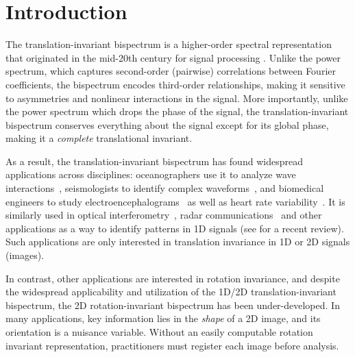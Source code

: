 \section{Introduction}
The translation-invariant bispectrum is a higher-order spectral representation that originated in the mid-20th century for signal processing \citep{tukey1953spectral, brillinger1991some, nikias1993signal}. Unlike the power spectrum, which captures second-order (pairwise) correlations between Fourier coefficients, the bispectrum encodes third-order relationships, making it sensitive to asymmetries and nonlinear interactions in the signal. More importantly, unlike the power spectrum which drops the phase of the signal, the translation-invariant bispectrum conserves everything about the signal except for its global phase, making it a \textit{complete} translational invariant.

As a result, the translation-invariant bispectrum has found widespread applications across disciplines: oceanographers use it to analyze wave interactions~\citep{elgar1985observations}, seismologists to identify complex waveforms~\citep{geophysics_2004}, and biomedical engineers to study electroencephalograms~\citep{zhang2000bispectrum} as well as heart rate variability~\citep{martin2021bispectral}. It is similarly used in optical interferometry~\citep{Gordon_2012}, radar communications~\citep{liu2023modulation} and other applications as a way to identify patterns in 1D signals (see \cite{koukiou2024identifying} for a recent review). Such applications are only interested in translation invariance in 1D or 2D signals (images).

In contrast, other applications are interested in rotation invariance, and despite the widespread applicability and utilization of the 1D/2D translation-invariant bispectrum, the 2D rotation-invariant bispectrum has been under-developed. In many applications, key information lies in the \textit{shape} of a 2D image, and its orientation is a nuisance variable. Without an easily computable rotation invariant representation, practitioners must register each image before analysis.

